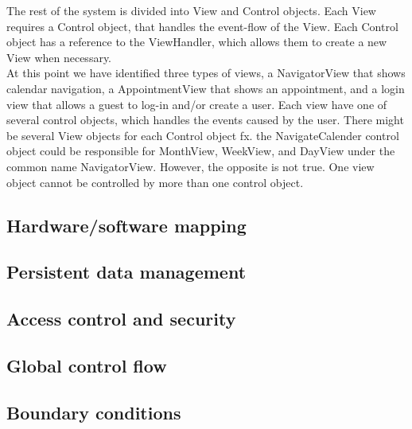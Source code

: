 The rest of the system is divided into View and Control objects. Each View requires a Control object, that handles the event-flow of the View. Each Control object has a reference to the ViewHandler, which allows them to create a new View when necessary. \\

At this point we have identified three types of views, a NavigatorView that shows calendar navigation, a AppointmentView that shows an appointment, and a login view that allows a guest to log-in and/or create a user. Each view have one of several control objects, which handles the events caused by the user. There might be several View objects for each Control object fx. the NavigateCalender control object could be responsible for MonthView, WeekView, and DayView under the common name NavigatorView. However, the opposite is not true. One view object cannot be controlled by more than one control object. 

\subsection{Hardware/software mapping}


\subsection{Persistent data management}


\subsection{Access control and security}

 
\subsection{Global control flow}


\subsection{Boundary conditions}


